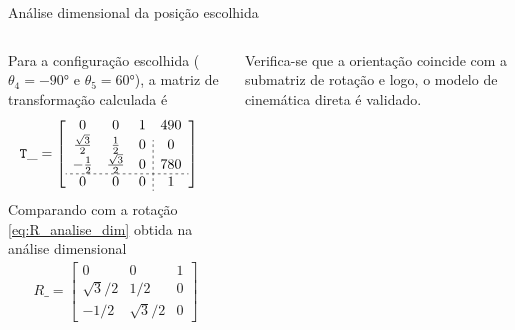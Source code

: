 \documentclass[aspectratio=169]{beamer}
\begin{document}
\begin{frame}{Análise dimensional da posição escolhida}
\begin{columns}
Para a configuração escolhida ($\theta_4 = \ang{-90}$ e $\theta_5 = \ang{60}$), a matriz de transformação calculada é
\begin{align*}
    \mathtt{T\_} 
    &=
    \left[
    \begin{array}{ccc;{2pt/2pt}c}
        0 & 0 & 1 & 490 \\
        \frac{\sqrt{3}}{2} & \frac{1}{2} & 0 & 0 \\  -\frac{1}{2} & \frac{\sqrt{3}}{2} & 0 & 780 \\
        \hdashline[2pt/2pt]
        0 & 0 & 0 & 1
    \end{array}
    \right]
\end{align*}
Comparando com a rotação \eqref{eq:R_analise_dim} obtida na análise dimensional
\begin{align*}
    R\_ = \left[ 
    \begin{array}{rrr}
        0 & 0 & 1 \\
        \sqrt{3}/2 & 1/2 & 0 \\
        -1/2 & \sqrt{3}/2 & 0
    \end{array}
    \right]
\end{align*}

Verifica-se que a orientação coincide com a submatriz de rotação e logo, o modelo de cinemática direta é validado.

\end{columns}
\end{frame}
\end{document}
